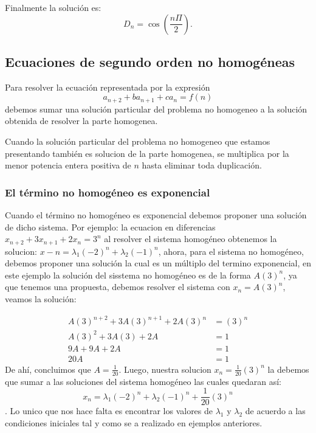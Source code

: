 \documentclass{article}
\begin{document}
Finalmente la solución es:
\begin{equation}
  \label{solucion determinante}
D_{n}=\cos(\frac{n\Pi}{2}).
\end{equation}


\subsection{Ecuaciones de segundo orden no homogéneas}
\label{sec:nohomogeneas}

Para resolver la ecuación representada por la expresión
$$a_{n+2}+ba_{n+1}+ca_{n}=f(n)$$ debemos sumar una solución particular
del problema no homogeneo a la solución obtenida de resolver la parte
homogenea.

Cuando la solución particular del problema no homogeneo que estamos
presentando también es solucion de la parte homogenea, se multiplica
por la menor potencia entera positiva de $n$ hasta eliminar toda
duplicación.

\subsubsection{El término no homogéneo es exponencial}
\label{sec:exponencial}

Cuando el t\'ermino no homog\'eneo es exponencial debemos proponer una
soluci\'on de dicho sistema. Por ejemplo: la ecuacion en diferencias
$x_{n+2}+3x_{n+1}+2x_n=3^n$ al resolver el sistema homog\'eneo
obtenemos la solucion: $x-n=\lambda_1(-2)^n+\lambda_2(-1)^n$, ahora,
para el sistema no homog\'eneo, debemos proponer una soluci\'on la
cual es un m\'ultiplo del termino exponencial, en este ejemplo la
soluci\'on del sisstema no homog\'eneo es de la forma $A(3)^n$, ya que
tenemos una propuesta, debemos resolver el sistema con $x_n=A(3)^n$,
veamos la soluci\'on:

\begin{align*}
  A(3)^{n+2}+3A(3)^{n+1}+2A(3)^n&=(3)^n\\
  A(3)^2+3A(3)+2A&=1\\
  9A+9A+2A&=1\\
  20A&=1
\end{align*}
De ahí, concluimos que $A=\frac{1}{20}$.
Luego, nuestra solucion $x_n=\frac{1}{20}(3)^n$ la debemos que sumar a las soluciones del sistema homog\'eneo las cuales quedaran así:
$$x_n=\lambda_1(-2)^n+\lambda_2(-1)^n+\frac{1}{20}(3)^n$$.
Lo unico que nos hace falta es encontrar los valores de $\lambda_1$ y $\lambda_2$ de acuerdo a las condiciones iniciales tal y como se a realizado en ejemplos anteriores.
\end{document}
